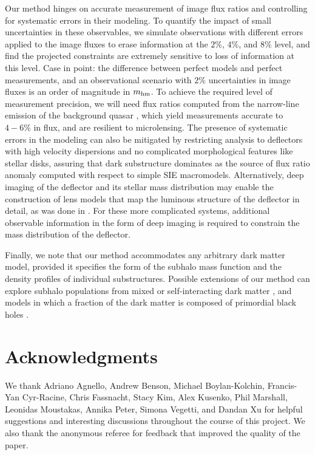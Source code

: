 Our method hinges on accurate measurement of image flux ratios and controlling for systematic errors in their modeling. To quantify the impact of small uncertainties in these observables, we simulate observations with different errors applied to the image fluxes to erase information at the $2\%$, $4\%$, and $8\%$ level, and find the projected constraints are extremely sensitive to loss of information at this level. Case in point: the difference between perfect models and perfect measurements, and an observational scenario with $2\%$ uncertainties in image fluxes is an order of magnitude in $m_{\rm{hm}}$. To achieve the required level of measurement precision, we will need flux ratios computed from the narrow-line emission of the background quasar \cite{Nierenberg++14,Nierenberg++17}, which yield measurements accurate to $4-6\%$ in flux, and are resilient to microlensing. The presence of systematic errors in the modeling can also be mitigated by restricting analysis to deflectors with high velocity dispersions and no complicated morphological features like stellar disks, assuring that dark substructure dominates as the source of flux ratio anomaly computed with respect to simple SIE macromodels. Alternatively, deep imaging of the deflector and its stellar mass distribution may enable the construction of lens models that map the luminous structure of the deflector in detail, as was done in \cite{Hsueh++16,Hsueh++17}. For these more complicated systems, additional observable information in the form of deep imaging is required to constrain the mass distribution of the deflector.

Finally, we note that our method accommodates any arbitrary dark matter model, provided it specifies the form of the subhalo mass function and the density profiles of individual substructures. Possible extensions of our method can explore subhalo populations from mixed or self-interacting dark matter \cite{Rocha++13}, and models in which a fraction of the dark matter is composed of primordial black holes \cite{CotnerKus17}. 

\section*{Acknowledgments}
We thank Adriano Agnello, Andrew Benson, Michael Boylan-Kolchin, Francis-Yan Cyr-Racine, Chris Fassnacht, Stacy Kim, Alex Kusenko, Phil Marshall, Leonidas Moustakas, Annika Peter, Simona Vegetti, and Dandan Xu for helpful suggestions and interesting discussions throughout the course of this project. We also thank the anonymous referee for feedback that improved the quality of the paper.  

